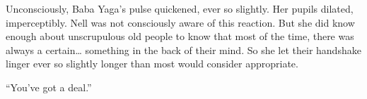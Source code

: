 Unconsciously, Baba Yaga’s pulse quickened, ever so slightly. Her pupils dilated, imperceptibly. Nell was not consciously aware of this reaction. But she did know enough about unscrupulous old people to know that most of the time, there was always a certain… something in the back of their mind. So she let their handshake linger ever so slightly longer than most would consider appropriate.

“You’ve got a deal.”





